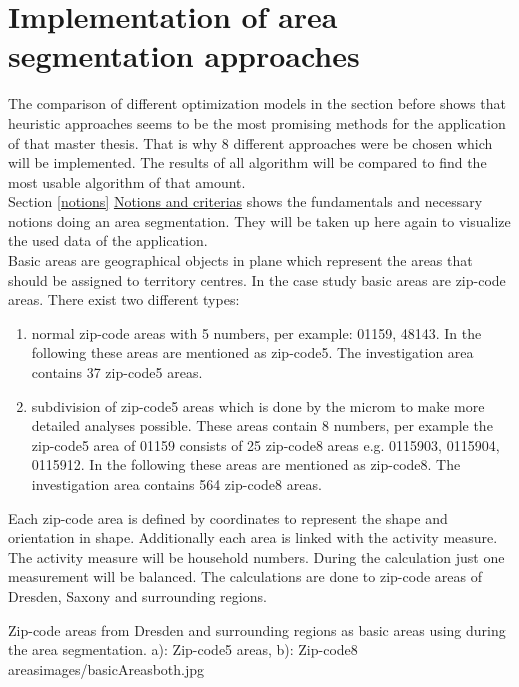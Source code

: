 \section{Implementation of area segmentation approaches}\label{Implementation}
The comparison of different optimization models in the section before shows that heuristic approaches seems to be the most promising methods for the application of that master thesis. That is why 8 different approaches were be chosen which will be implemented. The results of all algorithm will be compared to find the most usable algorithm of that amount.  \\
Section \ref{notions} \hyperref[notions]{Notions and criterias} shows the fundamentals and necessary notions doing an area segmentation. They will be taken up here again to visualize the used data of the application. \\
Basic areas are geographical objects in plane which represent the areas that should be assigned to territory centres. In the case study basic areas are zip-code areas. There exist two different types:
\begin{enumerate}
	\item normal zip-code areas with 5 numbers, per example: 01159, 48143. In the following these areas are mentioned as zip-code5. The investigation area contains 37 zip-code5 areas.
	\item subdivision of zip-code5 areas which is done by the microm to make more detailed analyses possible. These areas contain 8 numbers, per example the zip-code5 area of 01159 consists of 25 zip-code8 areas e.g. 0115903, 0115904, 0115912. In the following these areas are mentioned as zip-code8. The investigation area contains 564 zip-code8 areas.
\end{enumerate}

Each zip-code area is defined by coordinates to represent the shape and orientation in shape. Additionally each area is linked with the activity measure. The activity measure will be household numbers. During the calculation just one measurement will be balanced. The calculations are done to zip-code areas of Dresden, Saxony and surrounding regions.

\begin{figureOwn}{Zip-code areas from Dresden and surrounding regions as basic areas using during the area segmentation. a): Zip-code5 areas, b): Zip-code8 areas}{images/basicAreasboth.jpg}\end{figureOwn}

